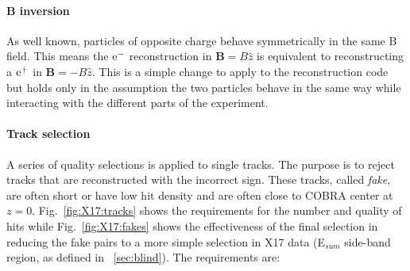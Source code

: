 \begin{refsection}
        \paragraph{\textbf{B} inversion}
        As well known, particles of opposite charge behave symmetrically in the same B field.
        This means the $\text{e}^-$ reconstruction in $\textbf{B}=B\hat{z}$ is equivalent to reconstructing a $\text{e}^+$ in $\textbf{B}=-B\hat{z}$.
        This is a simple change to apply to the reconstruction code but holds only in the assumption the two particles behave in the same way while interacting with the different parts of the experiment.

        \paragraph{Track selection}
        A series of quality selections is applied to single tracks. 
        The purpose is to reject tracks that are reconstructed with the incorrect sign. 
        These tracks, called \textit{fake}, are often short or have low hit density and are often close to COBRA center at $z=0$.
        Fig.~\ref{fig:X17:tracks}
        shows the requirements for the number and quality of hits while Fig.~\ref{fig:X17:fakes} shows the effectiveness of the final selection in reducing the fake pairs to a more simple selection in X17 data (E$_{sum}$ side-band region, as defined in ~\ref{sec:blind}).
        The requirements are:


\end{refsection}
